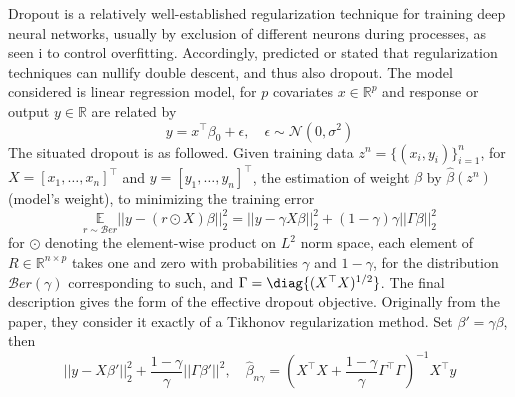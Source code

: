 \documentclass[10pt]{article} %
\begin{document}
Dropout is a relatively well-established regularization technique for training deep neural networks, usually by exclusion of different neurons during processes, as seen i \cite{srivastava2014dropout} to control overfitting. Accordingly, \cite{Yang_2024} predicted or stated that regularization techniques can nullify double descent, and thus also dropout. The model considered is linear regression model, for $p$ covariates $x\in\mathbb{R}^{p}$ and response or output $y\in\mathbb{R}$ are related by \begin{equation}
    y = x^{\top}\beta_{0}+\epsilon , \quad \epsilon \sim \mathcal{N}(0,\sigma^{2})
\end{equation}
The situated dropout is as followed. Given training data $z^{n}=\{(x_{i},y_{i})\}^{n}_{i=1}$, for $X=[x_1,\dots,x_n]^{\top}$ and $y=[y_{1},\dots,y_{n}]^{\top}$, the estimation of weight $\beta$ by $\hat{\beta}(z^n)$ (model's weight), to minimizing the training error 
\begin{equation}
    \underset{r\sim\mathcal{B}er}{\mathbb{E}} || y - (r\odot X)\beta ||^{2}_{2} = ||y-\gamma X\beta||^{2}_{2} + (1-\gamma)\gamma ||\Gamma \beta ||_{2}^{2}
\end{equation}
for $\odot$ denoting the element-wise product on $L^{2}$ norm space, each element of $R\in\mathbb{R}^{n\times p}$ takes one and zero with probabilities $\gamma$ and $1-\gamma$, for the distribution $\mathcal{B}er(\gamma)$ corresponding to such, and $\Gamma = \diag{(X^{\top}X)^{1/2}}$. The final description gives the form of the effective dropout objective. Originally from the paper, they consider it exactly of a Tikhonov regularization method. Set $\beta'=\gamma \beta$, then \begin{equation}
    ||y-X\beta'||_{2}^{2} + \frac{1-\gamma}{\gamma} ||\Gamma \beta'||^2, \quad \hat{\beta}_{n\gamma} = \left(X^{\top}X+\frac{1-\gamma}{\gamma}\Gamma^{\top}\Gamma\right)^{-1}X^{\top}y
\end{equation}
\end{document}
